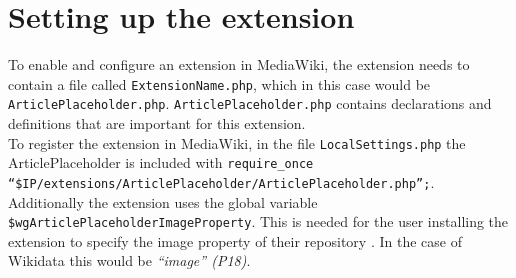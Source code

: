 \section{Setting up the extension}
	To enable and configure an extension in MediaWiki, the extension needs to contain a file called \texttt{\justify ExtensionName.php}, which in this case would be \texttt{\justify ArticlePlaceholder.php}. \texttt{\justify ArticlePlaceholder.php} contains declarations and definitions that are important for this extension. \\
	To register the extension in MediaWiki, in the file \texttt{\justify LocalSettings.php} the ArticlePlaceholder is included with \texttt{\justify require\_once ``\$IP/extensions/ArticlePlaceholder/ArticlePlaceholder.php'';}. \\
	Additionally the extension uses the global variable \texttt{\justify \$wgArticlePlaceholderImageProperty}. This is needed for the user installing the extension to specify the image property of their repository \citep{wiki:23}. In the case of Wikidata this would be \textit{``image'' (P18)}.